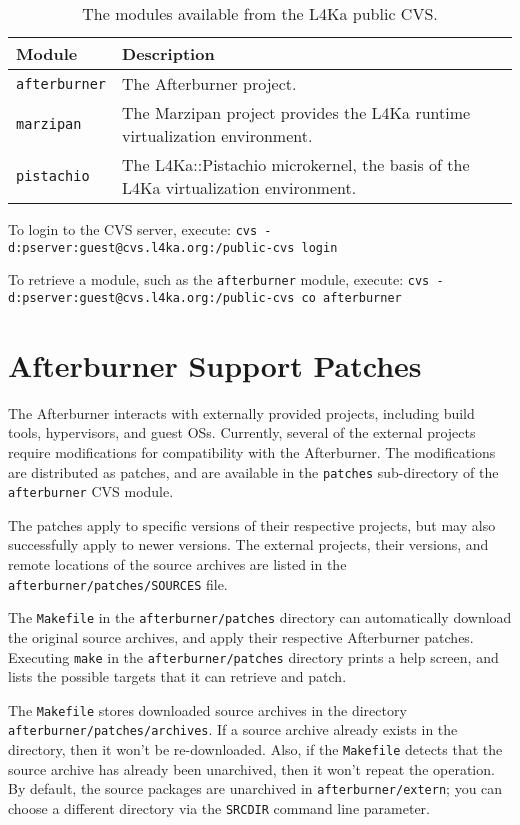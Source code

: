 \documentclass[twoside,a4paper]{report}
\newcommand{\code}[1]{{\tt #1}}
\newcommand{\cmd}[1]{\code{#1}}
\newcommand{\Pistachio}{L4Ka::Pistachio}
\newcommand{\Marzipan}{Marzipan}
\begin{document}
\begin{table}[hbt]
  \centering
  \begin{tabular}{l|p{6cm}}
  Module & Description \\
  \hline
  \code{afterburner} & The Afterburner project. \\
  \code{marzipan} & The \Marzipan{} project provides the L4Ka 
  runtime virtualization environment. \\
  \code{pistachio} & The \Pistachio{} microkernel, the basis of the
  L4Ka virtualization environment. \\
  \end{tabular}
  \caption{\label{t:modules}The modules available from the L4Ka public CVS.}
\end{table}

To login to the CVS server, execute:
\cmd{cvs -d:pserver:guest@cvs.l4ka.org:/public-cvs login}

To retrieve a module, such as the \code{afterburner} module, execute:
\cmd{cvs -d:pserver:guest@cvs.l4ka.org:/public-cvs co afterburner}


\chapter{Afterburner Support Patches}
\label{a:patch}

The Afterburner interacts with externally provided projects, including
build tools, hypervisors, and guest OSs.  Currently, several of the
external projects require modifications for compatibility with the
Afterburner.  The modifications are distributed as patches, and are
available in the \code{patches} sub-directory of the
\code{afterburner} CVS module.

The patches apply to specific versions of their respective projects,
but may also successfully apply to newer versions.  The external
projects, their versions, and remote locations of the source archives
are listed in the \code{afterburner/patches/SOURCES} file.

The \code{Makefile} in the \code{afterburner/patches} directory can
automatically download the original source archives, and apply their
respective Afterburner patches.  Executing \cmd{make} in the
\code{afterburner/patches} directory prints a help screen, and lists
the possible targets that it can retrieve and patch.

The \code{Makefile} stores downloaded source archives in the directory
\code{afterburner/patches/archives}.  If a source archive already
exists in the directory, then it won't be re-downloaded.  Also, if the
\code{Makefile} detects that the source archive has already been
unarchived, then it won't repeat the operation.  By default, the
source packages are unarchived in \code{afterburner/extern}; you can
choose a different directory via the \code{SRCDIR}
command line parameter.
\end{document}
